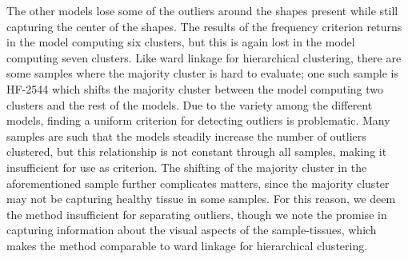 The other models lose some of the outliers around the shapes present while still capturing the center of the shapes. The results of the frequency criterion returns in the model computing six clusters, but this is again lost in the model computing seven clusters. Like ward linkage for hierarchical clustering, there are some samples where the majority cluster is hard to evaluate; one such sample is HF-2544 which shifts the majority cluster between the model computing two clusters and the rest of the models. Due to the variety among the different models, finding a uniform criterion for detecting outliers is problematic. Many samples are such that the models steadily increase the number of outliers clustered, but this relationship is not constant through all samples, making it insufficient for use as criterion. The shifting of the majority cluster in the aforementioned sample further complicates matters, since the majority cluster may not be capturing healthy tissue in some samples. For this reason, we deem the method insufficient for separating outliers, though we note the promise in capturing information about the visual aspects of the sample-tissues, which makes the method comparable to ward linkage for hierarchical clustering.

